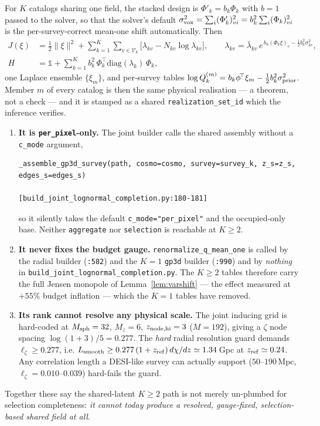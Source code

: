 For $K$ catalogs sharing one field, the stacked design is
$\Phi'_k=b_k\Phi_k$ with $b=1$ passed to the solver, so that the solver's
default $\sigma^2_{\rm vox}=\sum_i(\Phi'_k)^2_{vi}=b_k^2\sum_i(\Phi_k)^2_{vi}$
is the per-survey-correct mean-one shift automatically.  Then
\begin{align}
  J(\xi)&=\tfrac12\|\xi\|^2+\sum_{k=1}^K\sum_{v\in\mathcal V_k}
  \big[\lambda_{kv}-N_{kv}\log\lambda_{kv}\big],
  \qquad
  \lambda_{kv}=\bar\lambda_{kv}\,
  e^{\,b_k(\Phi_k\xi)_v-\frac12 b_k^2\sigma^2_{kv}},
  \label{eq:jointJ}\\
  H&=\mathbb 1+\sum_{k=1}^K b_k^2\,\Phi_k^{\!\top}\mathrm{diag}(\lambda_k)\,\Phi_k ,
  \label{eq:jointH}
\end{align}
one Laplace ensemble $\{\xi_m\}$, and per-survey tables
$\log Q_k^{(m)}=b_k\phi^{\!\top}\xi_m-\tfrac12 b_k^2\sigma^2_{\rm prior}$.
Member $m$ of every catalog is then the same physical realisation --- a theorem,
not a check --- and it is stamped as a shared \verb|realization_set_id| which
the inference verifies.

\begin{remark}
\label{rem:jointgaps}
\begin{enumerate}
\item \textbf{It is \texttt{per\_pixel}-only.}  The joint builder calls the
shared assembly without a \verb|c_mode| argument,
\begin{verbatim}
_assemble_gp3d_survey(path, cosmo=cosmo, survey=survey_k, z_s=z_s, edges_s=edges_s)
                                       [build_joint_lognormal_completion.py:180-181]
\end{verbatim}
so it silently takes the default \verb|c_mode="per_pixel"| and the
occupied-only base.  Neither \texttt{aggregate} nor \texttt{selection} is
reachable at $K\ge2$.
\item \textbf{It never fixes the budget gauge.}  \verb|renormalize_q_mean_one|
is called by the radial builder (\texttt{:582}) and the $K=1$ \texttt{gp3d}
builder (\texttt{:990}) and by \emph{nothing} in
\verb|build_joint_lognormal_completion.py|.  The $K\ge2$ tables therefore carry
the full Jensen monopole of Lemma~\ref{lem:varshift} --- the effect measured at
$+55\%$ budget inflation --- which the $K=1$ tables have removed.
\item \textbf{Its rank cannot resolve any physical scale.}  The joint inducing
grid is hard-coded at $M_{\rm sph}=32$, $M_z=6$, $z_{\rm node,hi}=3$
($M=192$), giving a $\zeta$ node spacing $\log(1+3)/5=0.277$.  The \emph{hard}
radial resolution guard demands $\ell_\zeta\ge0.277$, i.e.
$L_{\rm smooth}\ge0.277\,(1+z_{\rm ref})\,d\chi/dz\simeq1.34\,$Gpc at
$z_{\rm ref}\simeq0.24$.  Any correlation length a DESI-like survey can
actually support ($50$--$190$\,Mpc, $\ell_\zeta=0.010$--$0.039$) hard-fails the
guard.
\end{enumerate}
Together these say the shared-latent $K\ge2$ path is not merely un-plumbed for
selection completeness: \emph{it cannot today produce a resolved, gauge-fixed,
selection-based shared field at all}.
\end{remark}

